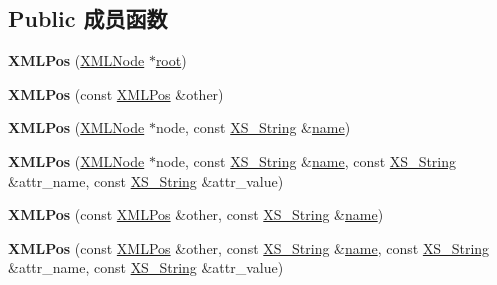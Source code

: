 \subsection*{Public 成员函数}
\begin{DoxyCompactItemize}
\item 
\mbox{\label{struct_x_m_l_storage_1_1_x_m_l_pos_a129be8749cb8f07734515c02ac937783}} 
{\bfseries X\+M\+L\+Pos} (\hyperlink{struct_x_m_l_storage_1_1_x_m_l_node}{X\+M\+L\+Node} $\ast$\hyperlink{struct__root}{root})
\item 
\mbox{\label{struct_x_m_l_storage_1_1_x_m_l_pos_a4f4462c1a29faefa24ddaa49c1eab115}} 
{\bfseries X\+M\+L\+Pos} (const \hyperlink{struct_x_m_l_storage_1_1_x_m_l_pos}{X\+M\+L\+Pos} \&other)
\item 
\mbox{\label{struct_x_m_l_storage_1_1_x_m_l_pos_a3889f9b33482bbf8f87736822accbf3e}} 
{\bfseries X\+M\+L\+Pos} (\hyperlink{struct_x_m_l_storage_1_1_x_m_l_node}{X\+M\+L\+Node} $\ast$node, const \hyperlink{struct_x_m_l_storage_1_1_x_s___string}{X\+S\+\_\+\+String} \&\hyperlink{structname}{name})
\item 
\mbox{\label{struct_x_m_l_storage_1_1_x_m_l_pos_a02fd534583f7eb83e37b39b2812739ee}} 
{\bfseries X\+M\+L\+Pos} (\hyperlink{struct_x_m_l_storage_1_1_x_m_l_node}{X\+M\+L\+Node} $\ast$node, const \hyperlink{struct_x_m_l_storage_1_1_x_s___string}{X\+S\+\_\+\+String} \&\hyperlink{structname}{name}, const \hyperlink{struct_x_m_l_storage_1_1_x_s___string}{X\+S\+\_\+\+String} \&attr\+\_\+name, const \hyperlink{struct_x_m_l_storage_1_1_x_s___string}{X\+S\+\_\+\+String} \&attr\+\_\+value)
\item 
\mbox{\label{struct_x_m_l_storage_1_1_x_m_l_pos_a7c3df3a54e8918a1d8925e72cb86b7e6}} 
{\bfseries X\+M\+L\+Pos} (const \hyperlink{struct_x_m_l_storage_1_1_x_m_l_pos}{X\+M\+L\+Pos} \&other, const \hyperlink{struct_x_m_l_storage_1_1_x_s___string}{X\+S\+\_\+\+String} \&\hyperlink{structname}{name})
\item 
\mbox{\label{struct_x_m_l_storage_1_1_x_m_l_pos_a0059871bc8c91c479c2747a639a82ed6}} 
{\bfseries X\+M\+L\+Pos} (const \hyperlink{struct_x_m_l_storage_1_1_x_m_l_pos}{X\+M\+L\+Pos} \&other, const \hyperlink{struct_x_m_l_storage_1_1_x_s___string}{X\+S\+\_\+\+String} \&\hyperlink{structname}{name}, const \hyperlink{struct_x_m_l_storage_1_1_x_s___string}{X\+S\+\_\+\+String} \&attr\+\_\+name, const \hyperlink{struct_x_m_l_storage_1_1_x_s___string}{X\+S\+\_\+\+String} \&attr\+\_\+value)

\end{DoxyCompactItemize}
